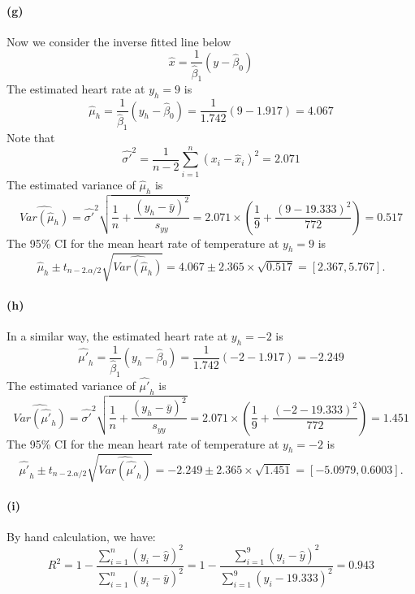 \documentclass{article}
\begin{document}
\paragraph{(g)}
 Now we consider the inverse fitted line below 
$$\hat{x}=\frac{1}{\hat{\beta}_1}(y-\hat{\beta}_0)$$
The estimated heart rate at $y_h=9$ is 
$$\hat{\mu}_h=\frac{1}{\hat{\beta}_1}(y_h-\hat{\beta}_0)
=\frac{1}{1.742}(9-1.917)=4.067$$
Note that 
$$\hat{\sigma'}^2=\frac{1}{n-2}\sum_{i=1}^{n}(x_i-\hat{x}_i)^2=2.071$$
The estimated variance of $\hat{\mu}_h$ is 
$$\widehat{Var(\hat{\mu}_h)}=\hat{\sigma'}^2\sqrt{\frac{1}{n}+\frac{(y_h-\bar{y})^2}{s_{yy}}}
=2.071\times(\frac{1}{9}+\frac{(9-19.333)^2}{772})=0.517$$
The 95\% CI for the mean heart rate of temperature at $y_h=9$ is
$$\hat{\mu}_h\pm t_{n-2.\alpha/2}\sqrt{\widehat{Var(\hat{\mu}_h)}}
=4.067 \pm 2.365\times \sqrt{0.517}=[2.367,5.767].$$

\paragraph{(h)}
 In a similar way, the estimated heart rate at $y_h=-2$ is 
$$\hat{\mu'}_h=\frac{1}{\hat{\beta}_1}(y_h-\hat{\beta}_0)
=\frac{1}{1.742}(-2-1.917)=-2.249$$
The estimated variance of $\hat{\mu'}_h$ is 
$$\widehat{Var(\hat{\mu'}_h)}=\hat{\sigma'}^2\sqrt{\frac{1}{n}+\frac{(y_h-\bar{y})^2}{s_{yy}}}
=2.071\times(\frac{1}{9}+\frac{(-2-19.333)^2}{772})=1.451$$
The 95\% CI for the mean heart rate of temperature at $y_h=-2$ is
$$\hat{\mu'}_h\pm t_{n-2.\alpha/2}\sqrt{\widehat{Var(\hat{\mu'}_h)}}
= -2.249\pm 2.365\times \sqrt{1.451}=[-5.0979,0.6003].$$

\paragraph{(i)}
By hand calculation, we have:
$$R^2=1-\frac{\sum_{i=1}^{n}(y_i-\hat{y})^2}{\sum_{i=1}^{n}(y_i-\bar{y})^2}
=1-\frac{\sum_{i=1}^{9}(y_i-\hat{y})^2}{\sum_{i=1}^{9}(y_i-19.333)^2}=0.943$$
\end{document}

